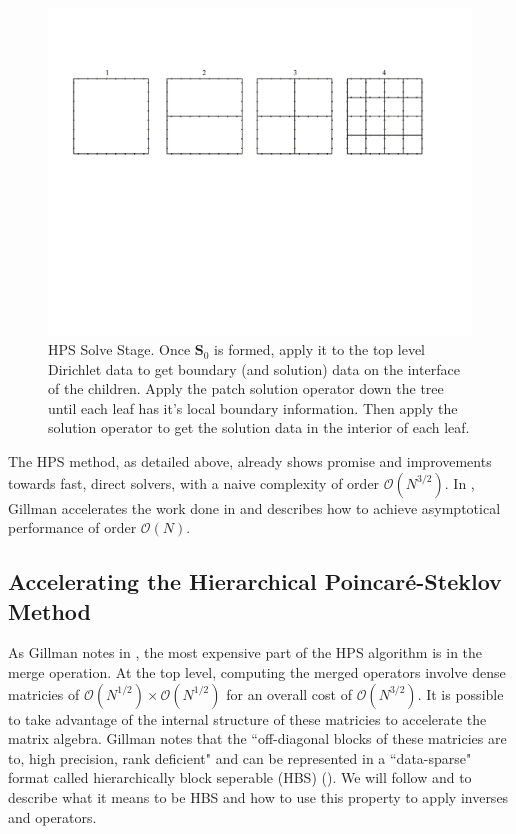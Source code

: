 \begin{figure}
    \centering
    \includegraphics[width=\columnwidth]{figures/solve_figure.pdf}
    \caption{HPS Solve Stage. Once $\textbf{S}_0$ is formed, apply it to the top level Dirichlet data to get boundary (and solution) data on the interface of the children. Apply the patch solution operator down the tree until each leaf has it's local boundary information. Then apply the solution operator to get the solution data in the interior of each leaf.}
    \label{fig:solve}
\end{figure}

The HPS method, as detailed above, already shows promise and improvements towards fast, direct solvers, with a naive complexity of order $\mathcal{O}(N^{3/2})$. In \citep{gillman2014direct}, Gillman accelerates the work done in \citep{martinsson2015hierarchical} and describes how to achieve asymptotical performance of order $\mathcal{O}(N)$.

\subsection{Accelerating the Hierarchical Poincaré-Steklov Method}

As Gillman notes in \citep{gillman2014direct}, the most expensive part of the HPS algorithm is in the merge operation. At the top level, computing the merged operators involve dense matricies of $\mathcal{O}(N^{1/2}) \times \mathcal{O}(N^{1/2})$ for an overall cost of $\mathcal{O}(N^{3/2})$. It is possible to take advantage of the internal structure of these matricies to accelerate the matrix algebra. Gillman notes that the ``off-diagonal blocks of these matricies are to, high precision, rank deficient" and can be represented in a ``data-sparse" format called hierarchically block seperable (HBS) (\citep{gillman2014direct}). We will follow \citep{gillman2014direct} and \citep{gillman2012direct} to describe what it means to be HBS and how to use this property to apply inverses and operators.

